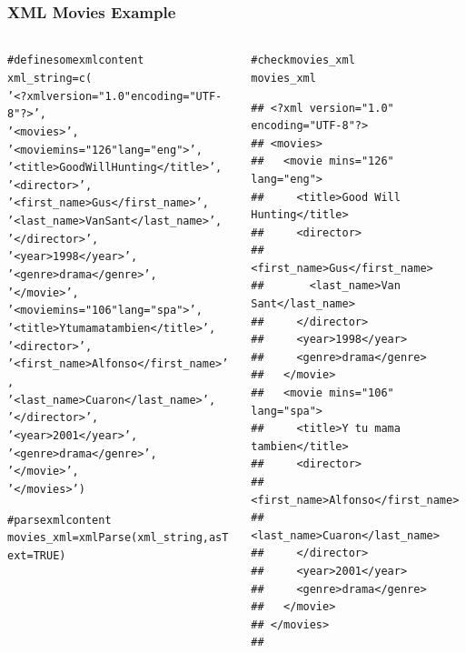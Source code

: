 \documentclass{beamer}\usepackage[]{graphicx}\usepackage[]{color}
\makeatletter
\newcommand{\hlnum}[1]{\textcolor[rgb]{0.063,0.58,0.627}{#1}}%
\newcommand{\hlstr}[1]{\textcolor[rgb]{0.063,0.58,0.627}{#1}}%
\newcommand{\hlcom}[1]{\textcolor[rgb]{0.588,0.588,0.588}{#1}}%
\newcommand{\hlstd}[1]{\textcolor[rgb]{0.196,0.196,0.196}{#1}}%
\newcommand{\hlkwb}[1]{\textcolor[rgb]{0.627,0,0.314}{#1}}%
\newcommand{\hlkwc}[1]{\textcolor[rgb]{0,0.631,0.314}{#1}}%
\newcommand{\hlkwd}[1]{\textcolor[rgb]{0.78,0.227,0.412}{#1}}%
\newenvironment{kframe}{%
 \def\at@end@of@kframe{}%
 \ifinner\ifhmode%
  \def\at@end@of@kframe{\end{minipage}}%
  \begin{minipage}{\columnwidth}%
 \fi\fi%
 \def\FrameCommand##1{\hskip\@totalleftmargin \hskip-\fboxsep
 \colorbox{shadecolor}{##1}\hskip-\fboxsep
     \hskip-\linewidth \hskip-\@totalleftmargin \hskip\columnwidth}%
 \MakeFramed {\advance\hsize-\width
   \@totalleftmargin\z@ \linewidth\hsize
   \@setminipage}}%
 {\par\unskip\endMakeFramed%
 \at@end@of@kframe}
\newenvironment{knitrout}{}{} %
\makeatother
\begin{document}
\begin{frame}[fragile]
\frametitle{XML Movies Example}

\begin{columns}[t]
\begin{column}{0.5\textwidth}
\begin{knitrout}\tiny
{}\color{fgcolor}\begin{kframe}
\begin{alltt}
\hlcom{# define some xml content}
\hlstd{xml_string} \hlkwb{=} \hlkwd{c}\hlstd{(}
  \hlstr{'<?xml version="1.0" encoding="UTF-8"?>'}\hlstd{,}
  \hlstr{'<movies>'}\hlstd{,}
  \hlstr{'<movie mins="126" lang="eng">'}\hlstd{,}
  \hlstr{'<title>Good Will Hunting</title>'}\hlstd{,}
  \hlstr{'<director>'}\hlstd{,}
  \hlstr{'<first_name>Gus</first_name>'}\hlstd{,}
  \hlstr{'<last_name>Van Sant</last_name>'}\hlstd{,}
  \hlstr{'</director>'}\hlstd{,}
  \hlstr{'<year>1998</year>'}\hlstd{,}
  \hlstr{'<genre>drama</genre>'}\hlstd{,}
  \hlstr{'</movie>'}\hlstd{,}
  \hlstr{'<movie mins="106" lang="spa">'}\hlstd{,}
  \hlstr{'<title>Y tu mama tambien</title>'}\hlstd{,}
  \hlstr{'<director>'}\hlstd{,}
  \hlstr{'<first_name>Alfonso</first_name>'}\hlstd{,}
  \hlstr{'<last_name>Cuaron</last_name>'}\hlstd{,}
  \hlstr{'</director>'}\hlstd{,}
  \hlstr{'<year>2001</year>'}\hlstd{,}
  \hlstr{'<genre>drama</genre>'}\hlstd{,}
  \hlstr{'</movie>'}\hlstd{,}
  \hlstr{'</movies>'}\hlstd{)}

\hlcom{# parse xml content}
\hlstd{movies_xml} \hlkwb{=} \hlkwd{xmlParse}\hlstd{(xml_string,} \hlkwc{asText} \hlstd{=} \hlnum{TRUE}\hlstd{)}
\end{alltt}
\end{kframe}
\end{knitrout}
\end{column}

\begin{column}{0.5\textwidth}
\begin{knitrout}\tiny
{}\color{fgcolor}\begin{kframe}
\begin{alltt}
\hlcom{# check movies_xml}
\hlstd{movies_xml}
\end{alltt}
\begin{verbatim}
## <?xml version="1.0" encoding="UTF-8"?>
## <movies>
##   <movie mins="126" lang="eng">
##     <title>Good Will Hunting</title>
##     <director>
##       <first_name>Gus</first_name>
##       <last_name>Van Sant</last_name>
##     </director>
##     <year>1998</year>
##     <genre>drama</genre>
##   </movie>
##   <movie mins="106" lang="spa">
##     <title>Y tu mama tambien</title>
##     <director>
##       <first_name>Alfonso</first_name>
##       <last_name>Cuaron</last_name>
##     </director>
##     <year>2001</year>
##     <genre>drama</genre>
##   </movie>
## </movies>
## 
\end{verbatim}
\end{kframe}
\end{knitrout}
\end{column}
\end{columns}

\end{frame}
\end{document}
